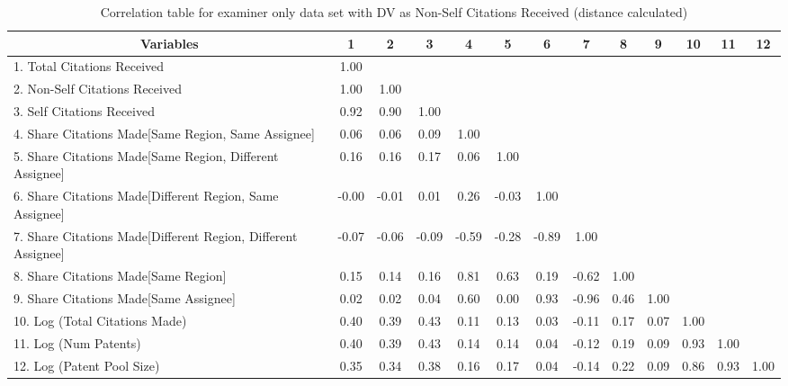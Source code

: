 \begin{table}[htbp]\centering \caption{Correlation table for examiner only data set with DV as Non-Self Citations Received (distance calculated)\label{e.ncorrelation}}
\scriptsize
\singlespacing
\begin{adjustbox}{angle=90}
\begin{tabular}{l  c  c  c  c  c  c  c  c  c  c  c  c }\hline\hline
\multicolumn{1}{c}{Variables} &1&2&3&4&5&6&7&8&9&10&11&12\\ \hline
1. Total Citations Received&1.00\\
2. Non-Self Citations Received&1.00&1.00\\
3. Self Citations Received&0.92&0.90&1.00\\
4. Share Citations Made[Same Region, Same Assignee]&0.06&0.06&0.09&1.00\\
5. Share Citations Made[Same Region, Different Assignee]&0.16&0.16&0.17&0.06&1.00\\
6. Share Citations Made[Different Region, Same Assignee]&-0.00&-0.01&0.01&0.26&-0.03&1.00\\
7. Share Citations Made[Different Region, Different Assignee]&-0.07&-0.06&-0.09&-0.59&-0.28&-0.89&1.00\\
8. Share Citations Made[Same Region]&0.15&0.14&0.16&0.81&0.63&0.19&-0.62&1.00\\
9. Share Citations Made[Same Assignee]&0.02&0.02&0.04&0.60&0.00&0.93&-0.96&0.46&1.00\\
10. Log (Total Citations Made)&0.40&0.39&0.43&0.11&0.13&0.03&-0.11&0.17&0.07&1.00\\
11. Log (Num Patents)&0.40&0.39&0.43&0.14&0.14&0.04&-0.12&0.19&0.09&0.93&1.00\\
12. Log (Patent Pool Size)&0.35&0.34&0.38&0.16&0.17&0.04&-0.14&0.22&0.09&0.86&0.93&1.00\\
\hline \hline 
 \end{tabular}
 \end{adjustbox}
\end{table}
